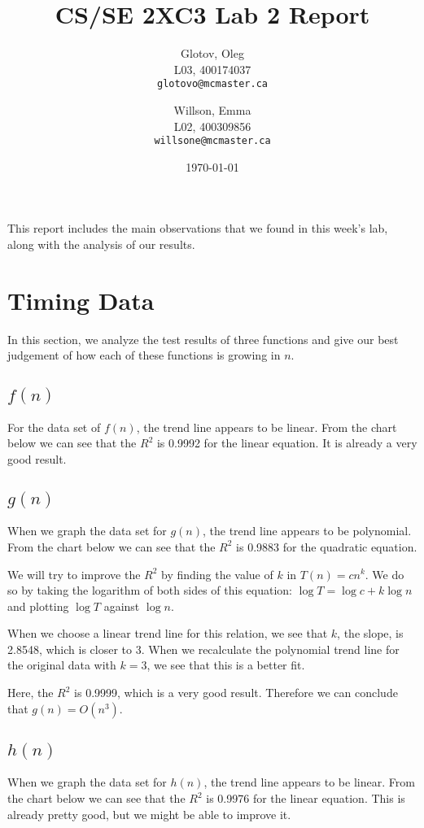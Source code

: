 \documentclass[12pt]{article}
\title{CS/SE 2XC3 Lab 2 Report}
\author{
  Glotov, Oleg\\ L03, 400174037\\
  \texttt{glotovo@mcmaster.ca}
  \and
  Willson, Emma\\ L02, 400309856\\
  \texttt{willsone@mcmaster.ca}
  }
\date{\today}
\begin{document}
\maketitle

This report includes the main observations that we found in this week's lab, along with the analysis of our results.

\newpage 
\section{Timing Data}
In this section, we analyze the test results of three functions and give our best judgement of how each of these functions is growing in $n$.
\subsection{\(f(n)\)}
For the data set of $f(n)$, the trend line appears to be linear. From the chart below we can see that the $R^2$ is 0.9992 for the linear equation. It is already a very good result.


\subsection{\(g(n)\)}
When we graph the data set for $g(n)$, the trend line appears to be polynomial. From the chart below we can see that the $R^2$ is 0.9883 for the quadratic equation. 


\noindent We will try to improve the $R^2$ by finding the value of $k$ in $T(n) = cn^k$. We do so by taking the logarithm of both sides of this equation: $\log{T}=\log{c}+k\log{n}$ and plotting $\log{T}$ against $\log{n}$. 


\noindent When we choose a linear trend line for this relation, we see that $k$, the slope, is 2.8548, which is closer to 3. When we recalculate the polynomial trend line for the original data with $k=3$, we see that this is a better fit.


\noindent Here, the $R^2$ is 0.9999, which is a very good result. Therefore we can conclude that $g(n) = O(n^3)$.

\subsection{\(h(n)\)}
When we graph the data set for $h(n)$, the trend line appears to be linear. From the chart below we can see that the $R^2$ is 0.9976 for the linear equation. This is already pretty good, but we might be able to improve it.
\end{document}
